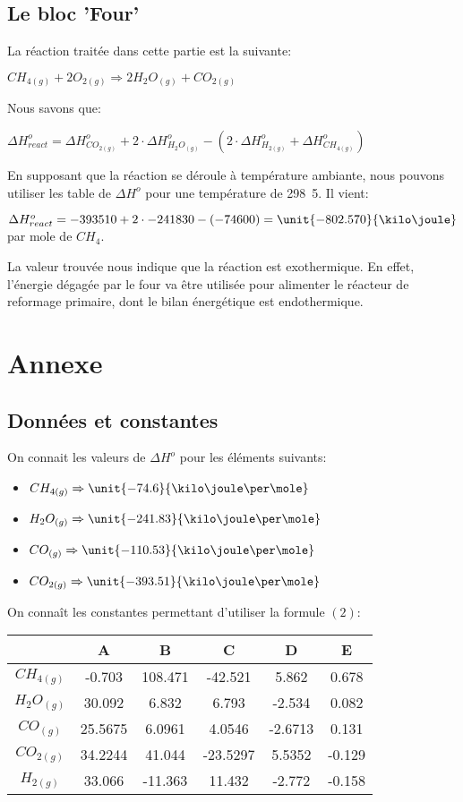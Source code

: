 \documentclass[11pt,a4paper]{report}
\begin{document}
\subsection*{Le bloc 'Four'}
La réaction traitée dans cette partie est la suivante:

$CH_{4(g)} + 2O_{2(g)} \Rightarrow 2H_{2}O_{(g)} + CO_{2(g)}$

Nous savons que:

$\Delta H^o_{react} = \Delta H^o_{CO_{2(g)}} + 2\cdot \Delta H^o_{H_{2}O_{(g)}} - (2\cdot \Delta H^o_{H_{2(g)}} + \Delta H^o_{CH_{4(g)}}) $

En supposant que la réaction se déroule à température ambiante, nous pouvons utiliser les table de $\Delta H^o$ pour une
température de \unit{298.5}{\kelvin}. Il vient:

$\Delta H^o_{react} = -393510 + 2\cdot -241830 - (-74600) = \unit{-802.570}{\kilo\joule}$ par mole de $CH_4$.

La valeur trouvée nous indique que la réaction est exothermique. En effet, l'énergie dégagée par le four va être 
utilisée pour alimenter le réacteur de reformage primaire, dont le bilan énergétique est endothermique.
\section*{Annexe}
\subsection*{Données et constantes}
On connait les valeurs de $\Delta H^o$ pour les éléments suivants:
\begin{itemize}
\item{$CH_{4(g)} \Rightarrow \unit{-74.6}{\kilo\joule\per\mole}$}
\item{$H_2O_{(g)} \Rightarrow \unit{-241.83}{\kilo\joule\per\mole}$}
\item{$CO_{(g)} \Rightarrow \unit{-110.53}{\kilo\joule\per\mole}$}
\item{$CO_{2(g)} \Rightarrow \unit{-393.51}{\kilo\joule\per\mole}$}
\end{itemize}

On connaît les constantes permettant d'utiliser la formule $(2)$:

\begin{tabular}{|c|c|c|c|c|c|}
\hline 
\rule[-1ex]{0pt}{2.5ex}  & A & B & C & D & E \\ 
\hline 
\rule[-1ex]{0pt}{2.5ex} $CH_{4(g)}$ & -0.703 & 108.471 & -42.521 & 5.862 & 0.678 \\ 
\hline 
\rule[-1ex]{0pt}{2.5ex} $H_2O_{(g)}$ & 30.092 & 6.832 & 6.793 & -2.534 & 0.082 \\ 
\hline 
\rule[-1ex]{0pt}{2.5ex} $CO_{(g)}$ & 25.5675 & 6.0961 & 4.0546 & -2.6713 & 0.131 \\ 
\hline 
\rule[-1ex]{0pt}{2.5ex} $CO_{2(g)}$ & 34.2244 & 41.044 & -23.5297 & 5.5352 & -0.129 \\ 
\hline 
\rule[-1ex]{0pt}{2.5ex} $H_{2(g)}$ & 33.066 & -11.363 & 11.432 & -2.772 & -0.158 \\ 
\hline 
\end{tabular} 
\end{document}
